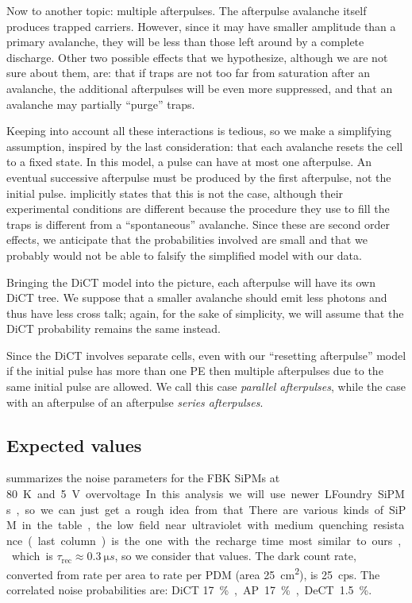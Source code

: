 Now to another topic: multiple afterpulses. The afterpulse avalanche itself
produces trapped carriers. However, since it may have smaller amplitude than a
primary avalanche, they will be less than those left around by a complete
discharge. Other two possible effects that we hypothesize, although we are not
sure about them, are: that if traps are not too far from saturation after an
avalanche, the additional afterpulses will be even more suppressed, and that an
avalanche may partially ``purge'' traps.

Keeping into account all these interactions is tedious, so we make a
simplifying assumption, inspired by the last consideration: that each avalanche
resets the cell to a fixed state. In this model, a pulse can have at most one
afterpulse. An eventual successive afterpulse must be produced by the first
afterpulse, not the initial pulse. \cite{cova1991} implicitly states that this
is not the case, although their experimental conditions are different because
the procedure they use to fill the traps is different from a ``spontaneous''
avalanche. Since these are second order effects, we anticipate that the
probabilities involved are small and that we probably would not be able to
falsify the simplified model with our data.

Bringing the DiCT model into the picture, each afterpulse will have its own
DiCT tree. We suppose that a smaller avalanche should emit less photons and
thus have less cross talk; again, for the sake of simplicity, we will assume
that the DiCT probability remains the same instead.

Since the DiCT involves separate cells, even with our ``resetting afterpulse''
model if the initial pulse has more than one PE then multiple afterpulses due
to the same initial pulse are allowed. We call this case \emph{parallel
afterpulses}, while the case with an afterpulse of an afterpulse \emph{series
afterpulses}.

\subsection{Expected values}
\label{sec:expval}

\cite[tab.~3.1~p.~62]{savarese2018} summarizes the noise parameters for the FBK
SiPMs at \SI{80}K and \SI{5}V overvoltage. In this analysis we will use newer
LFoundry SiPMs, so we can just get a rough idea from that. There are various
kinds of SiPM in the table, the low field near ultraviolet with medium
quenching resistance (last column) is the one with the recharge time most
similar to ours, which is $\tau_\text{rec} \approx \SI{0.3}{\micro s}$, so we
consider that values. The dark count rate, converted from rate per area to rate
per PDM (area \SI{25}{cm^2}), is \SI{25}{cps}. The correlated noise
probabilities are: DiCT \SI{17}\%, AP \SI{17}\%, DeCT \SI{1.5}\%.

